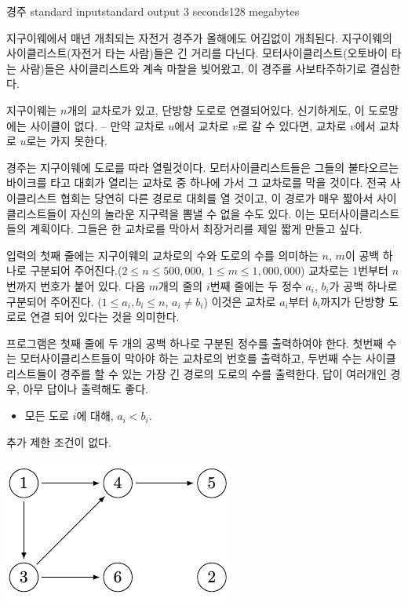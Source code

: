 \begin{problem}{경주}
	{standard input}{standard output}
	{3 seconds}{128 megabytes}{}
	
	지구이웨에서 매년 개최되는 자전거 경주가 올해에도 어김없이 개최된다. 지구이웨의 사이클리스트(자전거 타는 사람)들은 긴 거리를 다닌다. 모터사이클리스트(오토바이 타는 사람)들은 사이클리스트와 계속 마찰을 빚어왔고, 이 경주를 사보타주하기로 결심한다.
	
	지구이웨는 $n$개의 교차로가 있고, 단방향 도로로 연결되어있다. 신기하게도, 이 도로망에는 사이클이 없다. -- 만약 교차로 $u$에서 교차로 $v$로 갈 수 있다면, 교차로 $v$에서 교차로 $u$로는 가지 못한다.	

	경주는 지구이웨에 도로를 따라 열릴것이다. 모터사이클리스트들은 그들의 불타오르는 바이크를 타고 대회가 열리는 교차로 중 하나에 가서 그 교차로를 막을 것이다. 전국 사이클리스트 협회는 당연히 다른 경로로 대회를 열 것이고, 이 경로가 매우 짧아서 사이클리스트들이 자신의 놀라운 지구력을 뽐낼 수 없을 수도 있다. 이는 모터사이클리스트들의 계획이다. 그들은 한 교차로를 막아서 최장거리를 제일 짧게 만들고 싶다.
	
	\InputFile
	입력의 첫째 줄에는 지구이웨의 교차로의 수와 도로의 수를 의미하는 $n$, $m$이 공백 하나로 구분되어 주어진다.($2 \le n \le 500,000$, $1 \le m \le 1,000,000$) 교차로는 1번부터 $n$번까지 번호가 붙어 있다. 다음 $m$개의 줄의 $i$번째 줄에는 두 정수 $a_i$, $b_i$가 공백 하나로 구분되어 주어진다. ($1 \le a_i, b_i \le n$, $a_i \neq b_i$) 이것은 교차로 $a_i$부터 $b_i$까지가 단방향 도로로 연결 되어 있다는 것을 의미한다.
	
	
	
	\OutputFile
	
	프로그램은 첫째 줄에 두 개의 공백 하나로 구분된 정수를 출력하여야 한다. 첫번째 수는 모터사이클리스트들이 막아야 하는 교차로의 번호를 출력하고, 두번째 수는 사이클리스트들이 경주를 할 수 있는 가장 긴 경로의 도로의 수를 출력한다. 답이 여러개인 경우, 아무 답이나 출력해도 좋다.
	
	
	\begin{itemize}
		\item 모든 도로 $i$에 대해, $a_i < b_i$.
	\end{itemize}
	
	추가 제한 조건이 없다.
	
	
	
	\Examples
	
	\begin{example}
\end{example}

\Note

\includegraphics[width=0.3\linewidth]{raj.png}

\end{problem}

